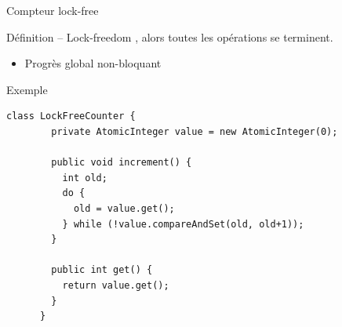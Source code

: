 
\begingroup

\begin{frame}[fragile]{Compteur lock-free}

  \begin{block}{Définition -- Lock-freedom}
    , alors toutes les opérations se terminent.
    \begin{itemize}
    \item Progrès global non-bloquant
    \end{itemize}
  \end{block}

  \begin{exampleblock}{Exemple}
    \begin{lstlisting}[gobble=6]
      class LockFreeCounter {
        private AtomicInteger value = new AtomicInteger(0);

        public void increment() {
          int old;
          do {
            old = value.get();
          } while (!value.compareAndSet(old, old+1));
        }

        public int get() {
          return value.get();
        }
      }
    \end{lstlisting}
  \end{exampleblock}

\end{frame}

\endgroup
\endinput
